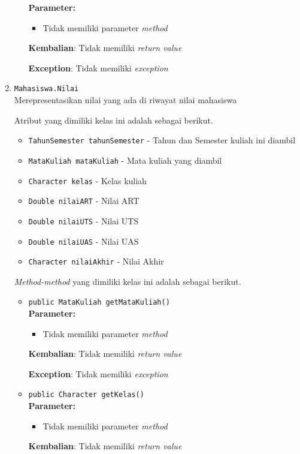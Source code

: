 \documentclass{article}
\begin{document}
\begin{enumerate}
\begin{itemize}
\textbf{Parameter:}\begin{itemize}
\item Tidak memiliki parameter \textit{method}
\end{itemize}
\textbf{Kembalian}: Tidak memiliki \textit{return value}

\textbf{Exception}: Tidak memiliki \textit{exception}

\end{itemize}
\item \texttt{Mahasiswa.Nilai}\\ 
Merepresentasikan nilai yang ada di riwayat nilai mahasiswa

Atribut yang dimiliki kelas ini adalah sebagai berikut.
\begin{itemize}
\item \texttt{TahunSemester tahunSemester} - Tahun dan Semester kuliah ini diambil
\item \texttt{MataKuliah mataKuliah} - Mata kuliah yang diambil
\item \texttt{Character kelas} - Kelas kuliah
\item \texttt{Double nilaiART} - Nilai ART
\item \texttt{Double nilaiUTS} - Nilai UTS
\item \texttt{Double nilaiUAS} - Nilai UAS
\item \texttt{Character nilaiAkhir} - Nilai Akhir
\end{itemize}
\textit{Method-method} yang dimiliki kelas ini adalah sebagai berikut.
\begin{itemize}
\item \texttt{public MataKuliah getMataKuliah()}\\ 


\textbf{Parameter:}\begin{itemize}
\item Tidak memiliki parameter \textit{method}
\end{itemize}
\textbf{Kembalian}: Tidak memiliki \textit{return value}

\textbf{Exception}: Tidak memiliki \textit{exception}

\item \texttt{public Character getKelas()}\\ 


\textbf{Parameter:}\begin{itemize}
\item Tidak memiliki parameter \textit{method}
\end{itemize}
\textbf{Kembalian}: Tidak memiliki \textit{return value}


\end{itemize}
\end{enumerate}
\end{document}
